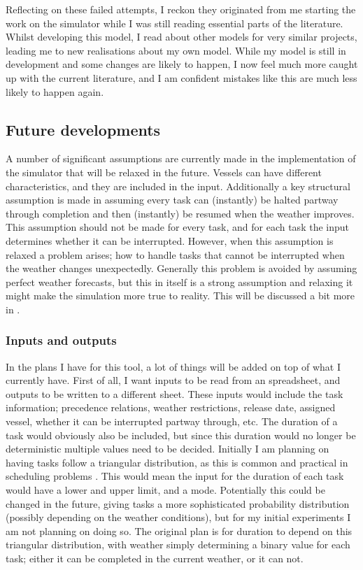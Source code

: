 \documentclass[a4paper,12pt]{article}
\begin{document}
Reflecting on these failed attempts, I reckon they originated from me starting the work on the simulator while I was still reading essential parts of the literature. Whilst developing this model, I read about other models for very similar projects, leading me to new realisations about my own model. While my model is still in development and some changes are likely to happen, I now feel much more caught up with the current literature, and I am confident mistakes like this are much less likely to happen again. 

\subsection{Future developments} \label{ss:simfut}
A number of significant assumptions are currently made in the implementation of the simulator that will be relaxed in the future. Vessels can have different characteristics, and they are included in the input. Additionally a key structural assumption is made in assuming every task can (instantly) be halted partway through completion and then (instantly) be resumed when the weather improves. This assumption should not be made for every task, and for each task the input determines whether it can be interrupted. However, when this assumption is relaxed a problem arises; how to handle tasks that cannot be interrupted when the weather changes unexpectedly. Generally this problem is avoided by assuming perfect weather forecasts, but this in itself is a strong assumption and relaxing it might make the simulation more true to reality. This will be discussed a bit more in . 

\subsubsection{Inputs and outputs} \label{sss:inou}
In the plans I have for this tool, a lot of things will be added on top of what I currently have. First of all, I want inputs to be read from an spreadsheet, and outputs to be written to a different sheet. These inputs would include the task information; precedence relations, weather restrictions, release date, assigned vessel, whether it can be interrupted partway through, etc.  The duration of a task would obviously also be included, but since this duration would no longer be deterministic multiple values need to be decided. Initially I am planning on having tasks follow a triangular distribution, as this is common and practical in scheduling problems \cite{williams1992practical}. This would mean the input for the duration of each task would have a lower and upper limit, and a mode. Potentially this could be changed in the future, giving tasks a more sophisticated probability distribution (possibly depending on the weather conditions), but for my initial experiments I am not planning on doing so. The original plan is for duration to depend on this triangular distribution, with weather simply determining a binary value for each task; either it can be completed in the current weather, or it can not. 
\end{document}
